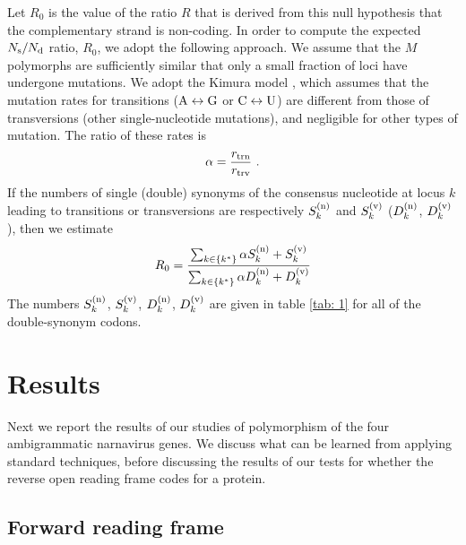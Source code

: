 \documentclass[unnumsec,webpdf,contemporary,large,namedate]{oup-authoring-template}%
\theoremstyle{thmstyleone}%
\theoremstyle{thmstyletwo}%
\theoremstyle{thmstylethree}%
\begin{document}
Let $R_0$ is the value of the ratio $R$ that is derived from this null hypothesis that 
the complementary strand is non-coding.
In order to compute the expected $N_{\rm s}/N_{\rm d}$ ratio, $R_0$, we adopt the following 
approach. We assume that the $M$ polymorphs are sufficiently similar
that only a small fraction of loci have undergone mutations. 
We adopt the Kimura model \citep{Kim80}, which assumes that the mutation
rates for transitions (${\rm A}\leftrightarrow {\rm G}$ or ${\rm C}\leftrightarrow{\rm U}$) are 
different from those of transversions (other single-nucleotide mutations), and negligible for 
other types of mutation. The ratio of these rates is  
%
\begin{equation}
\label{eq: 6.6}
\alpha=\frac{r_{\rm trn}}{r_{\rm trv}}
\ .
\end{equation}
%
If the numbers of single (double) synonyms of the consensus nucleotide at locus $k$ leading to 
transitions or transversions are respectively $S^{({\rm n})}_k$ and $S^{({\rm v})}_k$ 
($D^{({\rm n})}_k$, $D^{({\rm v})}_k$), then we estimate
%
\begin{equation}
\label{eq: 4.7}
R_0=
\frac{\sum_{k\in\{k^\ast\}}\alpha S_k^{({\rm n})}+S^{({\rm v})}_k}
{\sum_{k\in\{k^\ast\}}\alpha D^{({\rm n})}_k+D_k^{({\rm v})}}
\end{equation}
%
The numbers $S^{({\rm n})}_k$, $S^{({\rm v})}_k$, $D^{({\rm n})}_k$, $D^{({\rm v})}_k$ are given 
in table \ref{tab: 1} for all of the double-synonym codons.

\section{Results}
\label{sec: 5}

Next we report the results of our studies of polymorphism of the four ambigrammatic narnavirus genes.
We discuss what can be learned from applying standard techniques, before discussing 
the results of our tests for whether the reverse open reading frame codes for a protein.

\subsection{Forward reading frame}
\label{sec: 5.1}
\end{document}
